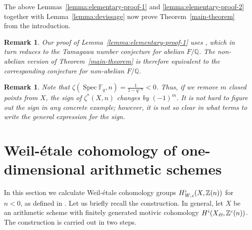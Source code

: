 \documentclass[draft]{article}
\DeclareMathOperator{\Spec}{Spec}
\newcommand{\FF}{\mathbb{F}}
\newcommand{\QQ}{\mathbb{Q}}
\newcommand{\ZZ}{\mathbb{Z}}
\newcommand{\et}{\text{\it \'{e}t}}
\newcommand{\Wc}{\text{\it W,c}}
\theoremstyle{myplain}
\theoremstyle{mydefinition}
\newtheorem{remark}[theorem]{Remark}
\begin{document}
The above Lemmas~\ref{lemma:elementary-proof-1} and
\ref{lemma:elementary-proof-2} together with Lemma~\ref{lemma:devissage} now
prove Theorem~\ref{main-theorem} from the introduction.

\begin{remark}
  \label{rmk:TNC}
  Our proof of Lemma~\ref{lemma:elementary-proof-1} uses
  \cite[Proposition~5.35]{Flach-Morin-2018}, which in turn reduces to the
  Tamagawa number conjecture for abelian $F/\QQ$. The non-abelian version of
  Theorem~\ref{main-theorem} is therefore equivalent to the corresponding
  conjecture for non-abelian $F/\QQ$.
\end{remark}

\begin{remark}
  Note that $\zeta (\Spec \FF_q, n) = \frac{1}{1 - q^{-n}} < 0$. Thus, if we
  remove $m$ closed points from $X$, the sign of $\zeta^* (X,n)$ changes by
  $(-1)^m$. It is not hard to figure out the sign in any concrete example;
  however, it is not so clear in what terms to write the general expression for
  the sign.
\end{remark}


\section{Weil-\'{e}tale cohomology of one-dimensional arithmetic schemes}
\label{sec:Weil-etale-cohomology-of-X}

In this section we calculate Weil-\'{e}tale cohomology groups
$H^i_\Wc (X, \ZZ(n))$ for ${n < 0}$, as defined in
\cite{Beshenov-Weil-etale-1}. Let us briefly recall the construction.
In general, let $X$ be an arithmetic scheme with finitely generated motivic
cohomology $H^i (X_\et, \ZZ^c(n))$. The construction is carried out in two
steps.
\end{document}
